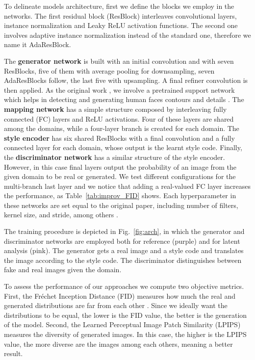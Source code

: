 \documentclass[conference]{IEEEtran}
\begin{document}
To delineate models architecture, first we define the blocks we employ in the networks. The first residual block (ResBlock) interleaves convolutional layers, instance normalization and Leaky ReLU activation functions. The second one involves adaptive instance normalization instead of the standard one, therefore we name it AdaResBlock. 

The \textbf{generator network} is built with an initial convolution and with seven ResBlocks, five of them with average pooling for downsampling, seven AdaResBlocks follow, the last five with upsampling. A final refiner convolution is then applied. As the original work \cite{Choi2020StarGAN2}, we involve a pretrained support network which helps in detecting and generating human faces contours and details \cite{wang2020adaptive}.
The \textbf{mapping network} has a simple structure composed by interleaving fully connected (FC) layers and ReLU activations. Four of these layers are shared among the domains, while a four-layer branch is created for each domain.
The \textbf{style encoder} has six shared ResBlocks with a final convolution and a fully connected layer for each domain, whose output is the learnt style code.
Finally, the \textbf{discriminator network} has a similar structure of the style encoder. However, in this case final layers output the probability of an image from the given domain to be real or generated. We test different configurations for the multi-branch last layer and we notice that adding a real-valued FC layer increases the performance, as Table~\ref{tab:improv_FID} shows. Each hyperparameter in these networks are set equal to the original paper, including number of filters, kernel size, and stride, among others \cite{Choi2020StarGAN2}.

The training procedure is depicted in Fig.~\ref{fig:arch}, in which the generator and discriminator networks are employed both for reference (purple) and for latent analysis (pink). The generator gets a real image and a style code and translates the image according to the style code. The discriminator distinguishes between fake and real images given the domain.




To assess the performance of our approaches we compute two objective metrics. First, the Fréchet Inception Distance (FID) measures how much the real and generated distributions are far from each other \cite{NIPS2017_8a1d6947}. Since we ideally want the distributions to be equal, the lower is the FID value, the better is the generation of the model. Second, the Learned Perceptual Image Patch Similarity (LPIPS) \cite{zhang2018unreasonable} measures the diversity of generated images. In this case, the higher is the LPIPS value, the more diverse are the images among each others, meaning a better result.
\end{document}
